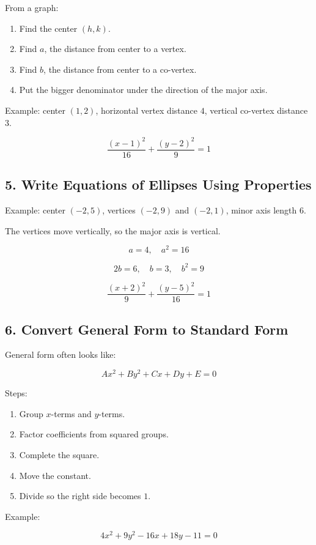 \documentclass[11pt]{article}
\begin{document}
From a graph:

\begin{enumerate}
  \item Find the center \((h,k)\).
  \item Find \(a\), the distance from center to a vertex.
  \item Find \(b\), the distance from center to a co-vertex.
  \item Put the bigger denominator under the direction of the major axis.
\end{enumerate}

Example: center \((1,2)\), horizontal vertex distance \(4\), vertical co-vertex distance \(3\).

\[
\frac{(x-1)^2}{16}+\frac{(y-2)^2}{9}=1
\]

\subsection*{5. Write Equations of Ellipses Using Properties}

Example: center \((-2,5)\), vertices \((-2,9)\) and \((-2,1)\), minor axis length \(6\).

The vertices move vertically, so the major axis is vertical.

\[
a=4,\quad a^2=16
\]

\[
2b=6,\quad b=3,\quad b^2=9
\]

\[
\frac{(x+2)^2}{9}+\frac{(y-5)^2}{16}=1
\]

\subsection*{6. Convert General Form to Standard Form}

General form often looks like:

\[
Ax^2+By^2+Cx+Dy+E=0
\]

Steps:

\begin{enumerate}
  \item Group \(x\)-terms and \(y\)-terms.
  \item Factor coefficients from squared groups.
  \item Complete the square.
  \item Move the constant.
  \item Divide so the right side becomes \(1\).
\end{enumerate}

Example:

\[
4x^2+9y^2-16x+18y-11=0
\]
\end{document}
